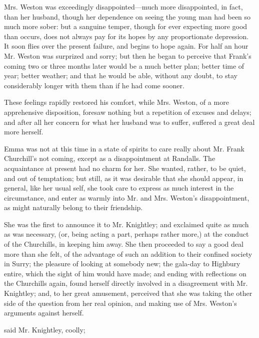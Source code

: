 Mrs. Weston was exceedingly disappointed---much more disappointed, in fact, than her husband, though her dependence on seeing the young man had been so much more sober: but a sanguine temper, though for ever expecting more good than occurs, does not always pay for its hopes by any proportionate depression. It soon flies over the present failure, and begins to hope again. For half an hour Mr. Weston was surprized and sorry; but then he began to perceive that Frank's coming two or three months later would be a much better plan; better time of year; better weather; and that he would be able, without any doubt, to stay considerably longer with them than if he had come sooner.

These feelings rapidly restored his comfort, while Mrs. Weston, of a more apprehensive disposition, foresaw nothing but a repetition of excuses and delays; and after all her concern for what her husband was to suffer, suffered a great deal more herself.

Emma was not at this time in a state of spirits to care really about Mr. Frank Churchill's not coming, except as a disappointment at Randalls. The acquaintance at present had no charm for her. She wanted, rather, to be quiet, and out of temptation; but still, as it was desirable that she should appear, in general, like her usual self, she took care to express as much interest in the circumstance, and enter as warmly into Mr. and Mrs. Weston's disappointment, as might naturally belong to their friendship.

She was the first to announce it to Mr. Knightley; and exclaimed quite as much as was necessary, (or, being acting a part, perhaps rather more,) at the conduct of the Churchills, in keeping him away. She then proceeded to say a good deal more than she felt, of the advantage of such an addition to their confined society in Surry; the pleasure of looking at somebody new; the gala-day to Highbury entire, which the sight of him would have made; and ending with reflections on the Churchills again, found herself directly involved in a disagreement with Mr. Knightley; and, to her great amusement, perceived that she was taking the other side of the question from her real opinion, and making use of Mrs. Weston's arguments against herself.

 said Mr. Knightley, coolly; 


